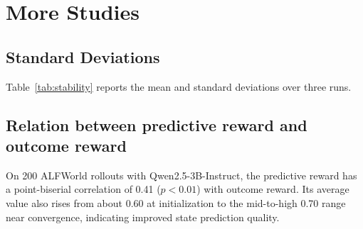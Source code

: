 \documentclass{llmxive}
\providecommand{\arraystretch}{1}
\begin{document}
\section{More Studies}
\label{appx:b}

\subsection{Standard Deviations}
Table~\ref{tab:stability} reports the mean and standard deviations over three runs.


\subsection{Relation between predictive reward and outcome reward}
On 200 ALFWorld rollouts with Qwen2.5-3B-Instruct, the predictive reward has a point-biserial correlation of 0.41 ($p<0.01$) with outcome reward. Its average value also rises from about 0.60 at initialization to the mid-to-high 0.70 range near convergence, indicating improved state prediction quality.

\begin{table}[t]
\begin{center}
\renewcommand{\arraystretch}{1}
\setlength\tabcolsep{16pt}
\end{center}
\vspace{-0.2cm}
\caption{Stability results over three runs with Qwen2.5-1.5B/7B-Instruct.}
\label{tab:stability}
\vspace{-0.5cm}
\end{table}
\end{document}
